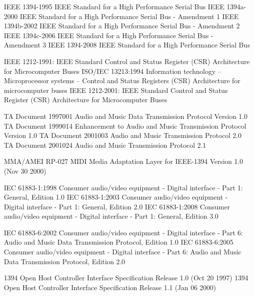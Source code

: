 \documentclass[onecolumn]{article}
\begin{document}
\begin{thebibliography}{99}

IEEE 1394-1995 IEEE Standard for a High Performance Serial Bus
IEEE 1394a-2000 IEEE Standard for a High Performance Serial Bus - Amendment 1
IEEE 1394b-2002 IEEE Standard for a High Performance Serial Bus - Amendment 2
IEEE 1394c-2006 IEEE Standard for a High Performance Serial Bus - Amendment 3
IEEE 1394-2008 IEEE Standard for a High Performance Serial Bus

IEEE 1212-1991: IEEE Standard Control and Status Register (CSR) Architecture for Microcomputer Buses
ISO/IEC 13213:1994 Information technology -- Microprocessor systems -- Control and Status Registers (CSR) Architecture for microcomputer buses
IEEE 1212-2001: IEEE Standard Control and Status Register (CSR) Architecture for Microcomputer Buses

TA Document 1997001 Audio and Music Data Transmission Protocol Version 1.0
TA Document 1999014 Enhancement to Audio and Music Transmission Protocol Version 1.0
TA Document 2001003 Audio and Music Transmission Protocol 2.0
TA Document 2001024 Audio and Music Transmission Protocol 2.1

MMA/AMEI RP-027 MIDI Media Adaptation Layer for IEEE-1394 Version 1.0 (Nov 30 2000)

IEC 61883-1:1998 Consumer audio/video equipment - Digital interface - Part 1: General, Edition 1.0
IEC 61883-1:2003 Consumer audio/video equipment - Digital interface - Part 1: General, Edition 2.0
IEC 61883-1:2008 Consumer audio/video equipment - Digital interface - Part 1: General, Edition 3.0

IEC 61883-6:2002 Consumer audio/video equipment - Digital interface - Part 6: Audio and Music Data Transmission Protocol, Edition 1.0
IEC 61883-6:2005 Consumer audio/video equipment - Digital interface - Part 6: Audio and Music Data Transmission Protocol, Edition 2.0

1394 Open Host Controller Interface Specification Release 1.0 (Oct 20 1997)
1394 Open Host Controller Interface Specification Release 1.1 (Jan 06 2000)


\end{thebibliography}
\end{document}

